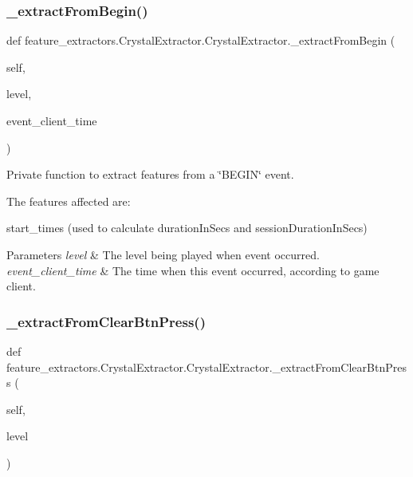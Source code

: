 \subsubsection{\texorpdfstring{\_extractFromBegin()}{\_extractFromBegin()}}
{\footnotesize\ttfamily def feature\+\_\+extractors.\+Crystal\+Extractor.\+Crystal\+Extractor.\+\_\+extract\+From\+Begin (\begin{DoxyParamCaption}\item[{}]{self,  }\item[{}]{level,  }\item[{}]{event\+\_\+client\+\_\+time }\end{DoxyParamCaption})\hspace{0.3cm}{\ttfamily [private]}}



Private function to extract features from a \char`\"{}\+B\+E\+G\+I\+N\char`\"{} event. 

The features affected are\+:
\begin{DoxyItemize}
\item start\+\_\+times (used to calculate duration\+In\+Secs and session\+Duration\+In\+Secs)
\end{DoxyItemize}


\begin{DoxyParams}{Parameters}
{\em level} & The level being played when event occurred. \\
\hline
{\em event\+\_\+client\+\_\+time} & The time when this event occurred, according to game client. \\
\hline
\end{DoxyParams}
\mbox{\label{classfeature__extractors_1_1_crystal_extractor_1_1_crystal_extractor_ab17cf3538783740964e3befadd1d089d}} 
\subsubsection{\texorpdfstring{\_extractFromClearBtnPress()}{\_extractFromClearBtnPress()}}
{\footnotesize\ttfamily def feature\+\_\+extractors.\+Crystal\+Extractor.\+Crystal\+Extractor.\+\_\+extract\+From\+Clear\+Btn\+Press (\begin{DoxyParamCaption}\item[{}]{self,  }\item[{}]{level }\end{DoxyParamCaption})\hspace{0.3cm}{\ttfamily [private]}}



